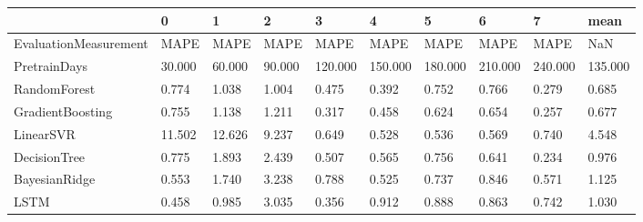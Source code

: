 \begin{tabular}{llllllllll}
\toprule
{} &      0 &      1 &      2 &       3 &       4 &       5 &       6 &       7 &    mean \\
\midrule
EvaluationMeasurement &   MAPE &   MAPE &   MAPE &    MAPE &    MAPE &    MAPE &    MAPE &    MAPE &     NaN \\
PretrainDays          & 30.000 & 60.000 & 90.000 & 120.000 & 150.000 & 180.000 & 210.000 & 240.000 & 135.000 \\
RandomForest          &  0.774 &  1.038 &  1.004 &   0.475 &   0.392 &   0.752 &   0.766 &   0.279 &   0.685 \\
GradientBoosting      &  0.755 &  1.138 &  1.211 &   0.317 &   0.458 &   0.624 &   0.654 &   0.257 &   0.677 \\
LinearSVR             & 11.502 & 12.626 &  9.237 &   0.649 &   0.528 &   0.536 &   0.569 &   0.740 &   4.548 \\
DecisionTree          &  0.775 &  1.893 &  2.439 &   0.507 &   0.565 &   0.756 &   0.641 &   0.234 &   0.976 \\
BayesianRidge         &  0.553 &  1.740 &  3.238 &   0.788 &   0.525 &   0.737 &   0.846 &   0.571 &   1.125 \\
LSTM                  &  0.458 &  0.985 &  3.035 &   0.356 &   0.912 &   0.888 &   0.863 &   0.742 &   1.030 \\
\bottomrule
\end{tabular}
